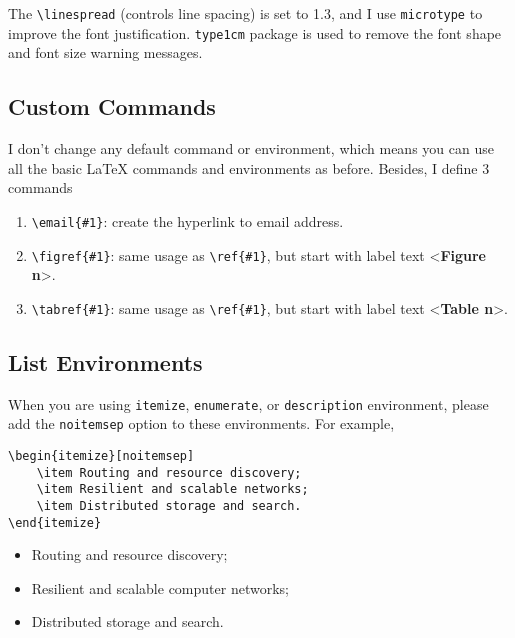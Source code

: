 \documentclass{elegantpaper}
\begin{document}
The \verb|\linespread| (controls line spacing) is set to 1.3, and I use \verb|microtype| to improve the font justification. \verb|type1cm| package is used to remove the font shape and font size warning messages.

\subsection{Custom Commands}

I don't change any default command or environment, which means you can use all the basic \LaTeX{} commands and environments as before.  Besides, I define 3 commands
\begin{enumerate}[noitemsep]
	\item \verb|\email{#1}|: create the hyperlink to email address.
	\item \verb|\figref{#1}|: same usage as \verb|\ref{#1}|, but start with label text <\textbf{Figure n}>.
	\item \verb|\tabref{#1}|: same usage as \verb|\ref{#1}|, but start with label text <\textbf{Table n}>.
\end{enumerate}{}

\subsection{List Environments}
When you are using \verb|itemize|, \verb|enumerate|, or \verb|description| environment, please add the \verb|noitemsep| option to these environments. For example, \\

\begin{minipage}[c]{0.45\linewidth}
\begin{Verbatim}[tabsize=4,frame=single,baselinestretch=1]
\begin{itemize}[noitemsep]
	\item Routing and resource discovery;
	\item Resilient and scalable networks;
	\item Distributed storage and search.
\end{itemize}
\end{Verbatim}
\end{minipage}
\begin{minipage}[c]{0.45\linewidth}
\begin{itemize}[noitemsep]
	\item Routing and resource discovery;
	\item Resilient and scalable computer networks;
	\item Distributed storage and search.
\end{itemize}
\end{minipage}
\end{document}

